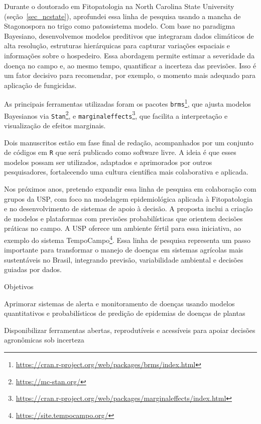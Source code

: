 \documentclass[12pt,a4paper,oneside]{book}
\newcommand{\NCState}{North Carolina State University}
\begin{document}
Durante o doutorado em Fitopatologia na \NCState{} (seção~\ref{sec_ncstate}), aprofundei essa linha de 
pesquisa usando a mancha de Stagonospora no trigo como patossistema modelo. Com base no paradigma 
Bayesiano, desenvolvemos modelos preditivos que integraram dados climáticos de alta resolução, 
estruturas hierárquicas para capturar variações espaciais e informações sobre o hospedeiro. Essa 
abordagem permite estimar a severidade da doença no campo e, ao mesmo tempo, quantificar a 
incerteza das previsões. Isso é um fator decisivo para recomendar, por exemplo, o momento mais adequado para aplicação de fungicidas.

As principais ferramentas utilizadas foram os pacotes
\texttt{brms}\footnote{\url{https://cran.r-project.org/web/packages/brms/index.html}}, que ajusta modelos
Bayesianos via \texttt{Stan}\footnote{\url{https://mc-stan.org/}}, e
\texttt{marginaleffects}\footnote{\url{https://cran.r-project.org/web/packages/marginaleffects/index.html}}, que facilita a 
interpretação e visualização de efeitos marginais.

Dois manuscritos estão em fase final de redação, acompanhados por um conjunto de códigos em \texttt{R} que será 
publicado como software livre. A ideia é que esses modelos possam ser utilizados, adaptados e 
aprimorados por outros pesquisadores, fortalecendo uma cultura científica mais colaborativa e aplicada.

Nos próximos anos, pretendo expandir essa linha de pesquisa em colaboração com grupos da USP, 
com foco na modelagem epidemiológica aplicada à Fitopatologia e no desenvolvimento de sistemas de 
apoio à decisão. A proposta inclui a criação de modelos e plataformas com previsões probabilísticas 
que orientem decisões práticas no campo. A USP oferece um ambiente fértil para essa iniciativa, 
ao exemplo do sistema TempoCampo\footnote{\url{https://site.tempocampo.org/}}. Essa 
linha de pesquisa representa um passo importante para transformar o manejo de doenças em sistemas agrícolas mais 
sustentáveis no Brasil, integrando previsão, variabilidade ambiental e decisões guiadas por dados.
  
\begin{fancyenum}{\faBullseye}{Objetivos}
\item Aprimorar sistemas de alerta e monitoramento de doenças usando modelos quantitativos e probabilísticos de predição 
  de epidemias de doenças de plantas
 \item Disponibilizar ferramentas abertas, reprodutíveis e acessíveis para apoiar decisões agronômicas sob incerteza
\end{fancyenum}
  
\end{document}
